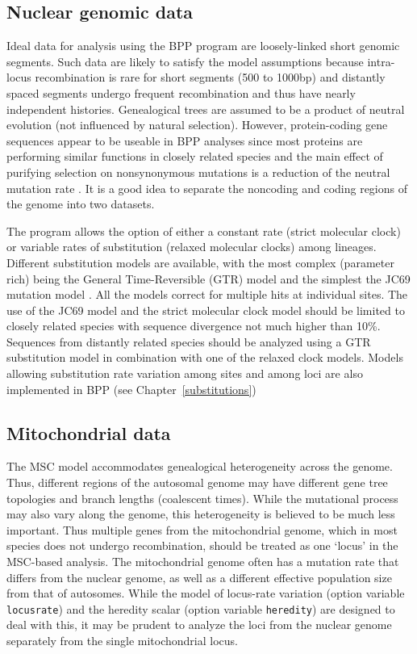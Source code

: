 \documentclass{book}
\numberwithin{equation}{section} \renewcommand{\baselinestretch}{0.55}
\begin{document}
\subsection{Nuclear genomic data}
Ideal data for analysis using the BPP program are loosely-linked short
genomic segments. Such data are likely to satisfy the model
assumptions because intra-locus recombination is rare for short
segments (500 to 1000bp) and distantly spaced segments undergo
frequent recombination and thus have nearly independent histories.
Genealogical trees are assumed to be a product of neutral evolution
(not influenced by natural selection).  However, protein-coding gene
sequences appear to be useable in \textsc{BPP} analyses since most
proteins are performing similar functions in closely related species
and the main effect of purifying selection on nonsynonymous mutations
is a reduction of the neutral mutation rate \citep{Shi2018,
  Thawornwattana2018MBE}.  It is a good idea to separate the noncoding
and coding regions of the genome into two datasets.

The program allows the option of either a constant rate (strict
molecular clock) or variable rates of substitution (relaxed molecular
clocks) among lineages. Different substitution models are available,
with the most complex (parameter rich) being the General
Time-Reversible (GTR) model and the simplest the JC69 mutation model
\citep{Jukes1969}. All the models correct for multiple hits at
individual sites.  The use of the JC69 model and the strict molecular
clock model should be limited to closely related species with sequence
divergence not much higher than 10\%. Sequences from distantly related
species should be analyzed using a GTR substitution model in
combination with one of the relaxed clock models.  Models allowing substitution
rate variation among sites and among loci are also implemented in BPP
(see Chapter~\ref{substitutions})

\subsection{Mitochondrial data}
The MSC model accommodates genealogical heterogeneity across the
genome. Thus, different regions of the autosomal genome may have
different gene tree topologies and branch lengths (coalescent times).
While the mutational process may also vary along the genome, this
heterogeneity is believed to be much less important.  Thus multiple
genes from the mitochondrial genome, which in most species does not
undergo recombination, should be treated as one ‘locus’ in the
MSC-based analysis.  The mitochondrial genome often has a mutation
rate that differs from the nuclear genome, as well as a different
effective population size from that of autosomes.  While the model of
locus-rate variation (option variable \texttt{locusrate}) and the
heredity scalar (option variable \texttt{heredity}) are designed to
deal with this, it may be prudent to analyze the loci from the nuclear
genome separately from the single mitochondrial locus.
\end{document}
